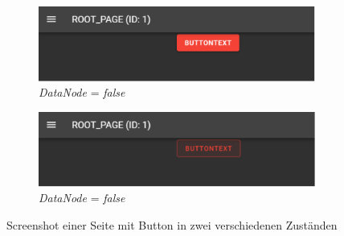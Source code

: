 \begin{figure}[ht]
  \centering
  \begin{subfigure}[b]{\textwidth}
    \centering
    \includegraphics[width=\textwidth]{content/hauptteil/umsetzungPoC/pocTest/res/screenPage.pdf}
    \caption{\emph{DataNode}  = \emph{false}}
    \label{fig:frontend:poc:button:true}
  \end{subfigure}
  \hspace{50.00mm}
  \begin{subfigure}[b]{\textwidth}
      \centering
      \includegraphics[width=\textwidth]{content/hauptteil/umsetzungPoC/pocTest/res/screenButtonClicked.pdf}
      \caption{\emph{DataNode}  = \emph{false}}
      \label{fig:frontend:poc:button:false}
  \end{subfigure}
  \caption[Screenshot einer Seite mit Button]{Screenshot einer Seite mit Button in zwei verschiedenen Zuständen}
  \label{fig:frontend:poc:button}
\end{figure}
